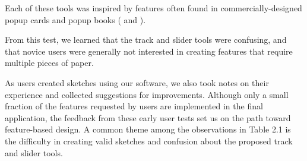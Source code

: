 Each of these tools was inspired by features often found in
commercially-designed popup cards and popup books
(\citet{birmingham1997pop} and \citet{valenta1997pop}).

From this test, we learned that the track and slider tools were
confusing, and that novice users were generally not interested in
creating features that require multiple pieces of paper.

As users created sketches using our software, we also took notes on
their experience and collected suggestions for improvements. Although
only a small fraction of the features requested by users are implemented
in the final application, the feedback from these early user tests set
us on the path toward feature-based design. A common theme among the
observations in Table 2.1 is the difficulty in creating valid sketches
and confusion about the proposed track and slider tools.

